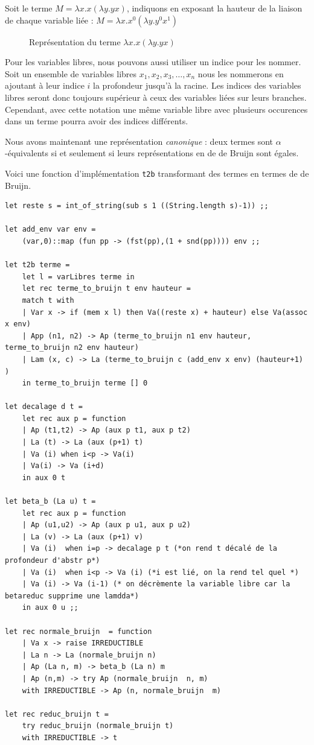 \documentclass[11pt]{book}
\begin{document}
Soit le terme $M=\lambda x.x(\lambda y. yx)$, indiquons en exposant la hauteur de la liaison
de chaque variable liée : $M=\lambda x.x^0(\lambda y. y^0x^1)$
\begin{figure}[H]
\centering
\caption{Représentation du terme $\lambda x.x(\lambda y. yx)$}
\end{figure}

Pour les variables libres, nous pouvons aussi utiliser un indice pour les nommer.
Soit un ensemble de variables libres ${x_1, x_2, x_3,\dots, x_n}$ nous les nommerons en ajoutant 
à leur indice $i$ la profondeur jusqu'à la racine. Les indices des variables libres seront
 donc toujours supérieur à ceux des variables liées sur leurs branches. Cependant, avec cette notation une
 même variable libre avec plusieurs occurences dans un terme pourra avoir des indices différents.

 Nous avons maintenant une représentation \textit{canonique} : deux termes sont $\alpha$-équivalents
 si et seulement si leurs représentations en de de Bruijn sont égales.


Voici une fonction d'implémentation \verb+t2b+ transformant des termes en termes de de Bruijn.
\begin{Verbatim}
let reste s = int_of_string(sub s 1 ((String.length s)-1)) ;;

let add_env var env =
	(var,0)::map (fun pp -> (fst(pp),(1 + snd(pp)))) env ;;

let t2b terme =
	let l = varLibres terme in
	let rec terme_to_bruijn t env hauteur =
	match t with
	| Var x -> if (mem x l) then Va((reste x) + hauteur) else Va(assoc x env)
	| App (n1, n2) -> Ap (terme_to_bruijn n1 env hauteur, terme_to_bruijn n2 env hauteur) 
	| Lam (x, c) -> La (terme_to_bruijn c (add_env x env) (hauteur+1) )
	in terme_to_bruijn terme [] 0

let decalage d t =
	let rec aux p = function
	| Ap (t1,t2) -> Ap (aux p t1, aux p t2) 
	| La (t) -> La (aux (p+1) t)
	| Va (i) when i<p -> Va(i)
	| Va(i) -> Va (i+d)
	in aux 0 t

let beta_b (La u) t =
	let rec aux p = function
	| Ap (u1,u2) -> Ap (aux p u1, aux p u2)
	| La (v) -> La (aux (p+1) v)
	| Va (i)  when i=p -> decalage p t (*on rend t décalé de la profondeur d'abstr p*)
	| Va (i)  when i<p -> Va (i) (*i est lié, on la rend tel quel *)
	| Va (i) -> Va (i-1) (* on décrèmente la variable libre car la betareduc supprime une lamdda*)
	in aux 0 u ;;

let rec normale_bruijn  = function
	| Va x -> raise IRREDUCTIBLE
	| La n -> La (normale_bruijn n)
	| Ap (La n, m) -> beta_b (La n) m
	| Ap (n,m) -> try Ap (normale_bruijn  n, m)
	with IRREDUCTIBLE -> Ap (n, normale_bruijn  m)

let rec reduc_bruijn t =
	try reduc_bruijn (normale_bruijn t)
	with IRREDUCTIBLE -> t 
\end{Verbatim}
\end{document}
